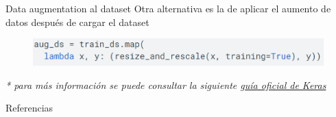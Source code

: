 \begin{frame}{Data augmentation al dataset}
Otra alternativa es la de aplicar el aumento de datos \alert{después de cargar el dataset}

\begin{figure}
    \centering
    \includegraphics[width=\textwidth]{Slides/figures/Tema 3/DAKeras_2.png}
\end{figure}

\textit{* para más información se puede consultar la siguiente \textcolor{blue}{\href{https://www.tensorflow.org/tutorials/images/data_augmentation}{guía oficial de Keras}}}
\end{frame}


\begin{frame}[allowframebreaks]{Referencias}
    
    
\end{frame}

